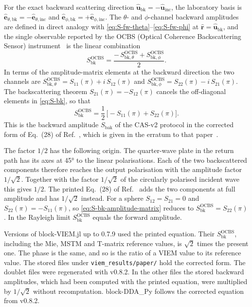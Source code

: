 \documentclass[11pt,a4paper]{article}
\begin{document}
For the exact backward scattering direction
$\hat{\bm{u}}_{\text{bk}} = -\hat{\bm{u}}_{\text{inc}}$, the laboratory
basis is
$\hat{\bm{e}}_{\theta,\text{bk}} = -\hat{\bm{e}}_{\theta,\text{inc}}$
and $\hat{\bm{e}}_{\phi,\text{bk}} = +\hat{\bm{e}}_{\phi,\text{inc}}$.
The $\theta$- and $\phi$-channel backward amplitudes are defined in
direct analogy with \eqref{eq:S-fw-theta}--\eqref{eq:S-fw-phi} at
$\hat{\bm{r}} = \hat{\bm{u}}_{\text{bk}}$, and the single observable
reported by the OCBS (Optical Coherence Backscattering Sensor)
instrument~\cite{Moteki2024} is the linear combination
\begin{equation}
  S_{\text{bk}}^{\text{OCBS}}
    = \frac{-\,S_{\text{bk},\theta}^{\text{OCBS}}
            + S_{\text{bk},\phi}^{\text{OCBS}}}{2}.
  \label{eq:S-bk}
\end{equation}
In terms of the amplitude-matrix elements at the backward direction the
two channels are
$S_{\text{bk},\theta}^{\text{OCBS}} = S_{11}(\pi) + i\,S_{12}(\pi)$ and
$S_{\text{bk},\phi}^{\text{OCBS}} = S_{22}(\pi) - i\,S_{21}(\pi)$.
The backscattering theorem $S_{21}(\pi) = -S_{12}(\pi)$ cancels the
off-diagonal elements in \eqref{eq:S-bk}, so that
\begin{equation}
  S_{\text{bk}}^{\text{OCBS}}
    = \frac{1}{2}\,\bigl[-S_{11}(\pi) + S_{22}(\pi)\bigr].
  \label{eq:S-bk-amplitude-matrix}
\end{equation}
This is the backward amplitude $S_{\text{bak}}$ of the CAS-v2 protocol in
the corrected form of Eq.~(28) of Ref.~\cite{Moteki2024}, which is given
in the erratum to that paper~\cite{Moteki2024Erratum}.

The factor $1/2$ has the following origin.
The quarter-wave plate in the return path has its axes at \ang{45} to
the linear polarisations.
Each of the two backscattered components therefore reaches the output
polarisation with the amplitude factor $1/\sqrt{2}$.
Together with the factor $1/\sqrt{2}$ of the circularly polarised
incident wave this gives $1/2$.
The printed Eq.~(28) of Ref.~\cite{Moteki2024} adds the two components
at full amplitude and has $1/\sqrt{2}$ instead.
For a sphere $S_{12} = S_{21} = 0$ and $S_{22}(\pi) = -S_{11}(\pi)$,
so \eqref{eq:S-bk-amplitude-matrix} reduces to
$S_{\text{bk}}^{\text{OCBS}} = S_{22}(\pi)$.
In the Rayleigh limit $S_{\text{bk}}^{\text{OCBS}}$ equals the forward
amplitude.

Versions of block-VIEM.jl up to 0.7.9 used the printed equation.
Their $S_{\text{bk}}^{\text{OCBS}}$, including the Mie, MSTM and
T-matrix reference values, is $\sqrt{2}$ times the present one.
The phase is the same, and so is the ratio of a VIEM value to its
reference value.
The stored files under \texttt{viem\_results/paper/} hold the corrected
form. The doublet files were regenerated with v0.8.2. In the other
files the stored backward amplitudes, which had been computed with the
printed equation, were multiplied by $1/\sqrt{2}$ without
recomputation.
block-DDA\_Py follows the corrected equation from v0.8.2.
\end{document}
